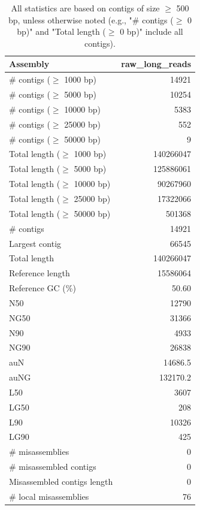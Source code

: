 \documentclass[12pt,a4paper]{article}
\begin{document}
\begin{table}[ht]
\begin{center}
\caption{All statistics are based on contigs of size $\geq$ 500 bp, unless otherwise noted (e.g., "\# contigs ($\geq$ 0 bp)" and "Total length ($\geq$ 0 bp)" include all contigs).}
\begin{tabular}{|l*{1}{|r}|}
\hline
Assembly & raw\_long\_reads \\ \hline
\# contigs ($\geq$ 1000 bp) & 14921 \\ \hline
\# contigs ($\geq$ 5000 bp) & 10254 \\ \hline
\# contigs ($\geq$ 10000 bp) & 5383 \\ \hline
\# contigs ($\geq$ 25000 bp) & 552 \\ \hline
\# contigs ($\geq$ 50000 bp) & 9 \\ \hline
Total length ($\geq$ 1000 bp) & 140266047 \\ \hline
Total length ($\geq$ 5000 bp) & 125886061 \\ \hline
Total length ($\geq$ 10000 bp) & 90267960 \\ \hline
Total length ($\geq$ 25000 bp) & 17322066 \\ \hline
Total length ($\geq$ 50000 bp) & 501368 \\ \hline
\# contigs & 14921 \\ \hline
Largest contig & 66545 \\ \hline
Total length & 140266047 \\ \hline
Reference length & 15586064 \\ \hline
Reference GC (\%) & 50.60 \\ \hline
N50 & 12790 \\ \hline
NG50 & 31366 \\ \hline
N90 & 4933 \\ \hline
NG90 & 26838 \\ \hline
auN & 14686.5 \\ \hline
auNG & 132170.2 \\ \hline
L50 & 3607 \\ \hline
LG50 & 208 \\ \hline
L90 & 10326 \\ \hline
LG90 & 425 \\ \hline
\# misassemblies & 0 \\ \hline
\# misassembled contigs & 0 \\ \hline
Misassembled contigs length & 0 \\ \hline
\# local misassemblies & 76 \\ \hline

\end{tabular}
\end{center}
\end{table}
\end{document}
